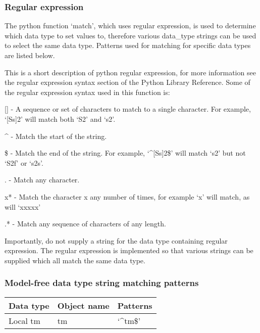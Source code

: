 




\subsubsection{Regular expression}

The python function `match', which uses regular expression, is used to determine which data
type to set values to, therefore various data\_type strings can be used to select the same
data type.  Patterns used for matching for specific data types are listed below.

This is a short description of python regular expression, for more information see the
regular expression syntax section of the Python Library Reference.  Some of the regular
expression syntax used in this function is:

    [] - A sequence or set of characters to match to a single character.  For example,
    `[Ss]2' will match both `S2' and `s2'.

    \^{} - Match the start of the string.

    \$ - Match the end of the string.  For example, `\^{}[Ss]2\$' will match `s2' but not `S2f'
    or `s2s'.

    . - Match any character.

    x* - Match the character x any number of times, for example `x' will match, as will
    `xxxxx'

    .* - Match any sequence of characters of any length.

Importantly, do not supply a string for the data type containing regular expression.  The
regular expression is implemented so that various strings can be supplied which all match
the same data type.


\subsubsection{Model-free data type string matching patterns}



\begin{center}
\begin{tabular}{lll}
\toprule
Data type & Object name & Patterns \\
\midrule
 Local tm                &  tm            &  `\^{}tm\$'                                            \\
\bottomrule
\end{tabular}
\end{center}

